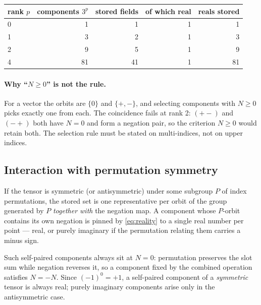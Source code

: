\documentclass[11pt,a4paper]{article}
\begin{document}
\begin{center}
  \begin{tabular}{lrrrr}
    \toprule
    rank $p$ & components $3^p$ & stored fields & of which real & reals stored \\
    \midrule
    0 & 1  & 1  & 1 & 1 \\
    1 & 3  & 2  & 1 & 3 \\
    2 & 9  & 5  & 1 & 9 \\
    4 & 81 & 41 & 1 & 81 \\
    \bottomrule
  \end{tabular}
\end{center}

\paragraph{Why ``$N\geq 0$'' is not the rule.}  For a vector the orbits
are $\{0\}$ and $\{+,-\}$, and selecting components with $N\geq 0$ picks
exactly one from each.  The coincidence fails at rank 2: $(+-)$ and $(-+)$
both have $N=0$ and form a negation pair, so the criterion $N\geq 0$ would
retain both.  The selection rule must be stated on multi-indices, not on
upper indices.

\subsection{Interaction with permutation symmetry}
\label{sec:symmetry}

If the tensor is symmetric (or antisymmetric) under some subgroup $P$ of
index permutations, the stored set is one representative per orbit of the
group generated by $P$ \emph{together with} the negation map.  A
component whose $P$-orbit contains its own negation is pinned by
\eqref{eq:reality} to a single real number per point --- real, or purely
imaginary if the permutation relating them carries a minus sign.

Such self-paired components always sit at $N=0$: permutation preserves
the slot sum while negation reverses it, so a component fixed by the
combined operation satisfies $N=-N$.  Since $(-1)^0=+1$, a self-paired
component of a \emph{symmetric} tensor is always real; purely imaginary
components arise only in the antisymmetric case.
\end{document}
